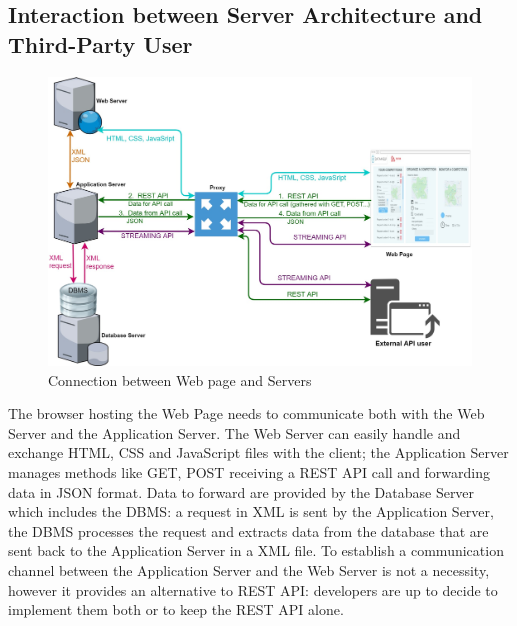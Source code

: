 \subsection{Interaction between Server Architecture and Third-Party User}
\begin{figure}[H]
\caption{Connection between Web page and Servers}
\includegraphics[width = \textwidth]{sections/architecturalDesign/overview_web.jpg}
\end{figure}

The browser hosting the Web Page needs to communicate both with the Web Server and the Application Server. 
The Web Server can easily handle and exchange HTML, CSS and JavaScript files with the client; the Application Server manages methods like GET, POST receiving a REST API call and forwarding data in JSON format. Data to forward are provided by the Database Server which includes the DBMS: a request in XML is sent by the Application Server, the DBMS processes the request and extracts data from the database that are sent back to the Application Server in a XML file. To establish a communication channel between the Application Server and the Web Server is not a necessity, however it provides an alternative to REST API: developers are up to decide to implement them both or to keep the REST API alone. 


